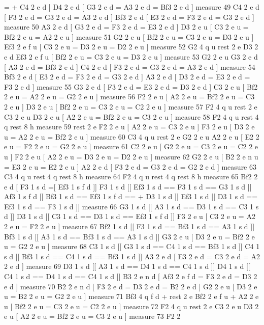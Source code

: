 = + C4 2 e d \mbox{]} D4 2 e d \mbox{[} G3 2 e d = A3 2 e d = Bf3 2 e d \mbox{]} measure 49 C4 2 e d \mbox{[} F3 2 e d = G3 2 e d = A3 2 e d \mbox{]} Bf3 2 e d \mbox{[} E3 2 e d = F3 2 e d = G3 2 e d \mbox{]} measure 50 A3 2 e d \mbox{[} G3 2 e d = F3 2 e d = E3 2 e d \mbox{]} D3 2 e u \mbox{[} C3 2 e u = Bf2 2 e u = A2 2 e u \mbox{]} measure 51 G2 2 e u \mbox{[} Bf2 2 e u = C3 2 e u = D3 2 e u \mbox{]} Ef3 2 e f u \mbox{[} C3 2 e u = D3 2 e u = D2 2 e u \mbox{]} measure 52 G2 4 q u rest 2 e D3 2 e d Ef3 2 e f u \mbox{[} Bf2 2 e u = C3 2 e u = D3 2 e u \mbox{]} measure 53 G2 2 e u G3 2 e d \mbox{[} A3 2 e d = Bf3 2 e d \mbox{]} C4 2 e d \mbox{[} F3 2 e d = G3 2 e d = A3 2 e d \mbox{]} measure 54 Bf3 2 e d \mbox{[} E3 2 e d = F3 2 e d = G3 2 e d \mbox{]} A3 2 e d \mbox{[} D3 2 e d = E3 2 e d = F3 2 e d \mbox{]} measure 55 G3 2 e d \mbox{[} F3 2 e d = E3 2 e d = D3 2 e d \mbox{]} C3 2 e u \mbox{[} Bf2 2 e u = A2 2 e u = G2 2 e u \mbox{]} measure 56 F2 2 e u \mbox{[} A2 2 e u = Bf2 2 e u = C3 2 e u \mbox{]} D3 2 e u \mbox{[} Bf2 2 e u = C3 2 e u = C2 2 e u \mbox{]} measure 57 F2 4 q u rest 2 e C3 2 e u D3 2 e u \mbox{[} A2 2 e u = Bf2 2 e u = C3 2 e u \mbox{]} measure 58 F2 4 q u rest 4 q rest 8 h measure 59 rest 2 e F2 2 e u \mbox{[} A2 2 e u = C3 2 e u \mbox{]} F3 2 e u \mbox{[} D3 2 e u = A2 2 e u = Bf2 2 e u \mbox{]} measure 60 C3 4 q u rest 2 e G2 2 e u A2 2 e u \mbox{[} E2 2 e u = F2 2 e u = G2 2 e u \mbox{]} measure 61 C2 2 e u \mbox{[} G2 2 e u = C3 2 e u = C2 2 e u \mbox{]} F2 2 e u \mbox{[} A2 2 e u = D3 2 e u = D2 2 e u \mbox{]} measure 62 G2 2 e u \mbox{[} B2 2 e n u = E3 2 e u = E2 2 e u \mbox{]} A2 2 e d \mbox{[} F3 2 e d = G3 2 e d = G2 2 e d \mbox{]} measure 63 C3 4 q u rest 4 q rest 8 h measure 64 F2 4 q u rest 4 q rest 8 h measure 65 Bf2 2 e d \mbox{[} F3 1 s d =\mbox{[} Ef3 1 s f d \mbox{]}\mbox{]} F3 1 s d \mbox{[}\mbox{[} Ef3 1 s d == F3 1 s d == G3 1 s d \mbox{]}\mbox{]} Af3 1 s f d \mbox{[}\mbox{[} Bf3 1 s d == Ef3 1 s f d == + D3 1 s d \mbox{]}\mbox{]} Ef3 1 s d \mbox{[}\mbox{[} D3 1 s d == Ef3 1 s d == F3 1 s d \mbox{]}\mbox{]} measure 66 G3 1 s d \mbox{[}\mbox{[} A3 1 s d == D3 1 s d == C3 1 s d \mbox{]}\mbox{]} D3 1 s d \mbox{[}\mbox{[} C3 1 s d == D3 1 s d == Ef3 1 s f d \mbox{]}\mbox{]} F3 2 e u \mbox{[} C3 2 e u = A2 2 e u = F2 2 e u \mbox{]} measure 67 Bf2 1 s d \mbox{[}\mbox{[} F3 1 s d == Bf3 1 s d == A3 1 s d \mbox{]}\mbox{]} Bf3 1 s d \mbox{[}\mbox{[} A3 1 s d == Bf3 1 s d == A3 1 s d \mbox{]}\mbox{]} G3 2 e u \mbox{[} D3 2 e u = Bf2 2 e u = G2 2 e u \mbox{]} measure 68 C3 1 s d \mbox{[}\mbox{[} G3 1 s d == C4 1 s d == Bf3 1 s d \mbox{]}\mbox{]} C4 1 s d \mbox{[}\mbox{[} Bf3 1 s d == C4 1 s d == Bf3 1 s d \mbox{]}\mbox{]} A3 2 e d \mbox{[} E3 2 e d = C3 2 e d = A2 2 e d \mbox{]} measure 69 D3 1 s d \mbox{[}\mbox{[} A3 1 s d == D4 1 s d == C4 1 s d \mbox{]}\mbox{]} D4 1 s d \mbox{[}\mbox{[} C4 1 s d == D4 1 s d == C4 1 s d \mbox{]}\mbox{]} B3 2 e n d \mbox{[} Af3 2 e f d = F3 2 e d = D3 2 e d \mbox{]} measure 70 B2 2 e n d \mbox{[} F3 2 e d = D3 2 e d = B2 2 e d \mbox{]} G2 2 e u \mbox{[} D3 2 e u = B2 2 e u = G2 2 e u \mbox{]} measure 71 Bf3 4 q f d + rest 2 e Bf2 2 e f u + A2 2 e u \mbox{[} Bf2 2 e u = C3 2 e u = C2 2 e u \mbox{]} measure 72 F2 4 q u rest 2 e C3 2 e u D3 2 e u \mbox{[} A2 2 e u = Bf2 2 e u = C3 2 e u \mbox{]} measure 73 F2 2 